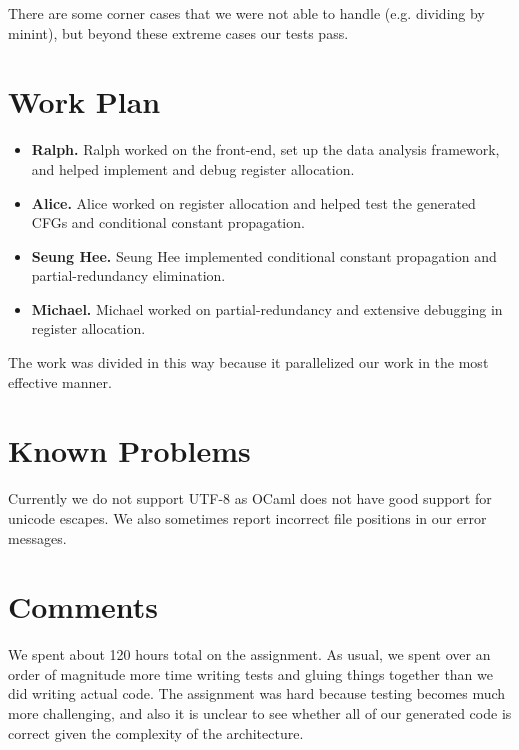 \documentclass{hw}
\begin{document}
There are some corner cases that we were not able to handle (e.g. dividing by minint), but
beyond these extreme cases our tests pass.
\section{Work Plan}\label{sec:workplan}
\begin{itemize}
  \item \textbf{Ralph.}
    Ralph worked on the front-end, set up the data analysis framework, and helped implement and debug register allocation.

  \item \textbf{Alice.}
    Alice worked on register allocation and helped test the generated CFGs and conditional constant propagation.

  \item \textbf{Seung Hee.}
    Seung Hee implemented conditional constant propagation and partial-redundancy elimination.

  \item \textbf{Michael.}
    Michael worked on partial-redundancy and extensive debugging in register allocation.
\end{itemize}

The work was divided in this way because it parallelized our work in the most
effective manner.

\section{Known Problems}\label{sec:problems}
Currently we do not support UTF-8 as OCaml does not have good support for
unicode escapes. We also sometimes report incorrect file positions in our error
messages.

\section{Comments}\label{sec:comments}
We spent about 120 hours total on the assignment. As usual, we spent over an
order of magnitude more time writing tests and gluing things together than we
did writing actual code. The assignment was hard because testing becomes much
more challenging, and also it is unclear to see whether all of our generated
code is correct given the complexity of the architecture.
\end{document}
